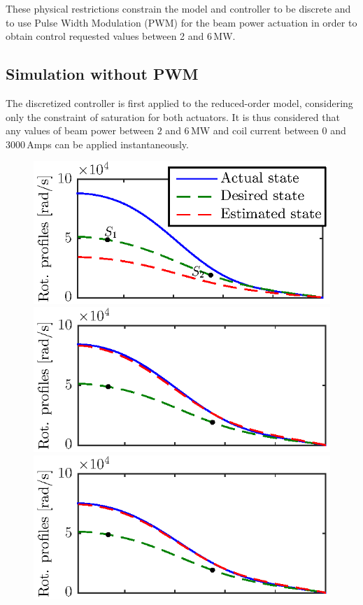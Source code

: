 \documentclass[12pt,lot, lof]{puthesis}
\begin{document}
These physical restrictions constrain the model and controller to be discrete and to use Pulse Width Modulation (PWM) for the beam power actuation in order to obtain control requested values between 2 and 6\,MW.


\subsection{Simulation without PWM}
\label{noPWM}

The discretized controller is first applied to the reduced-order model, considering only the constraint of saturation for both actuators. It is thus considered that any values of beam power between $2$ and $6$\,MW and coil current between $0$ and $3000$\,Amps can be applied instantaneously.   

\begin{figure}
	\centering
	\includegraphics[width=0.65 \linewidth]{fig13a} \\[-0.3em]
	\includegraphics[width=0.65 \linewidth]{fig13b} \\[-0.3em]
	\includegraphics[width=0.65 \linewidth]{fig13c} \\[-0.3em]

\end{figure}
\end{document}
